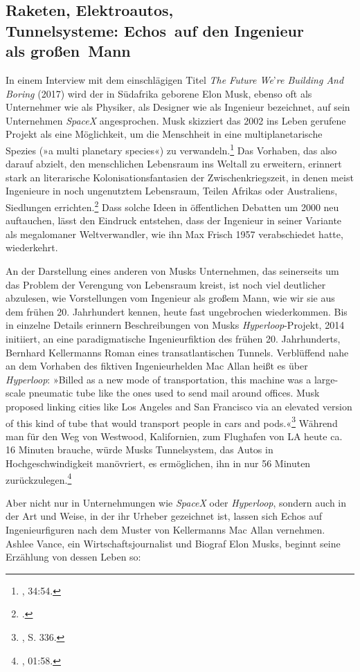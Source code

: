 \documentclass[%
	fontsize=10pt,%
	twoside,%
	headings=optiontoheadandtoc,%
	showtrims]{scrbook}
\renewenvironment{quote}{%
  \addmargin[\genericindent]{0pt}%
  \KOMAoptions{parskip=true}%
  \ifdim\parskip>0pt\else\addvspace{\intextsep}\fi
}{%
  \par
  \endaddmargin\vspace{\intextsep}
}
\begin{document}
\subsection[Raketen, Elektroautos,    Tunnel\-systeme: Echos~auf den Ingenieur    als großen~Mann]{Raketen, Elektroautos, \- \protect\\ Tunnel\-systeme: Echos~auf den Ingenieur\- \protect\\  als großen~Mann}
\par\noindent In einem Interview mit dem einschlägigen Titel \emph{The Future We}\textquoteright{}\emph{re Building \textendash{} And Boring} (2017) wird der in Südafrika geborene Elon Musk, ebenso oft als Unternehmer wie als Physiker, als Designer wie als Ingenieur bezeichnet, auf sein Unternehmen \emph{SpaceX} angesprochen. Musk skizziert das 2002 ins Leben gerufene Projekt als eine Möglichkeit, um die Menschheit in eine multiplanetarische Spezies (»a multi planetary species«) zu verwandeln.\footnote{\cite[][]{musk2017a}, 34:54.}  Das Vorhaben, das also darauf abzielt, den menschlichen Lebensraum ins Weltall zu erweitern, erinnert stark an literarische Kolonisationsfantasien der Zwischenkriegszeit, in denen meist Ingenieure in noch ungenutztem Lebensraum, Teilen Afrikas oder Australiens, Siedlungen errichten.\footnote{\cite[][]{hahnemann2010a}.}  Dass solche Ideen in öffentlichen Debatten um 2000 neu auftauchen, lässt den Eindruck entstehen, dass der Ingenieur in seiner Variante als megalomaner Weltverwandler, wie ihn Max Frisch 1957 verabschiedet hatte, wiederkehrt.\par An der Darstellung eines anderen von Musks Unternehmen, das seinerseits um das Problem der Verengung von Lebensraum kreist, ist noch viel deutlicher abzulesen, wie Vorstellungen vom Ingenieur als großem Mann, wie wir sie aus dem frühen 20. Jahrhundert kennen, heute fast ungebrochen wiederkommen. Bis in einzelne Details erinnern Beschreibungen von Musks \emph{Hyperloop}-Projekt, 2014 initiiert, an eine paradigmatische Ingenieurfiktion des frühen 20. Jahrhunderts, Bernhard Kellermanns Roman eines transatlantischen Tunnels. Verblüffend nahe an dem Vorhaben des fiktiven Ingenieurhelden Mac Allan heißt es über \emph{Hyperloop}: »Billed as a new mode of transportation, this machine was a large-scale pneumatic tube like the ones used to send mail around offices. Musk proposed linking cities like Los Angeles and San Francisco via an elevated version of this kind of tube that would transport people in cars and pods.«\footnote{\cite[][]{vance2015a}, S. 336.}  Während man für den Weg von Westwood, Kalifornien, zum Flughafen von LA heute ca. 16 Minuten brauche, würde Musks Tunnelsystem, das Autos in Hochgeschwindigkeit manövriert, es ermöglichen, ihn in nur 5\textendash{}6 Minuten zurückzulegen.\footnote{\cite[][]{musk2017a}, 01:58.} \par Aber nicht nur in Unternehmungen wie \emph{SpaceX} oder \emph{Hyperloop}, sondern auch in der Art und Weise, in der ihr Urheber gezeichnet ist, lassen sich Echos auf Ingenieurfiguren nach dem Muster von Kellermanns Mac Allan vernehmen. Ashlee Vance, ein Wirtschaftsjournalist und Biograf Elon Musks, beginnt seine Erzählung von dessen Leben so:\begin{quote}

\end{quote}
\end{document}
